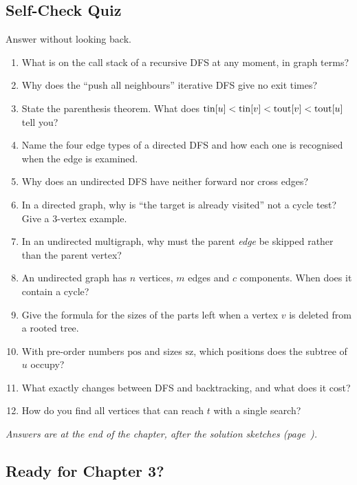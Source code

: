 \subsection{Self-Check Quiz}

Answer without looking back.
\begin{enumerate}[leftmargin=*]
    \item What is on the call stack of a recursive DFS at any moment, in graph terms?
    \item Why does the ``push all neighbours'' iterative DFS give no exit times?
    \item State the parenthesis theorem. What does $\mathrm{tin}[u] < \mathrm{tin}[v] < \mathrm{tout}[v] < \mathrm{tout}[u]$ tell you?
    \item Name the four edge types of a directed DFS and how each one is recognised when the edge is examined.
    \item Why does an undirected DFS have neither forward nor cross edges?
    \item In a directed graph, why is ``the target is already visited'' not a cycle test? Give a 3-vertex example.
    \item In an undirected multigraph, why must the parent \emph{edge} be skipped rather than the parent vertex?
    \item An undirected graph has $n$ vertices, $m$ edges and $c$ components. When does it contain a cycle?
    \item Give the formula for the sizes of the parts left when a vertex $v$ is deleted from a rooted tree.
    \item With pre-order numbers $\mathrm{pos}$ and sizes $\mathrm{sz}$, which positions does the subtree of $u$ occupy?
    \item What exactly changes between DFS and backtracking, and what does it cost?
    \item How do you find all vertices that can reach $t$ with a single search?
\end{enumerate}

\noindent\textit{Answers are at the end of the chapter, after the solution sketches (page~\pageref{ssec:ch2-quiz-answers}).}

\subsection{Ready for Chapter 3?}


